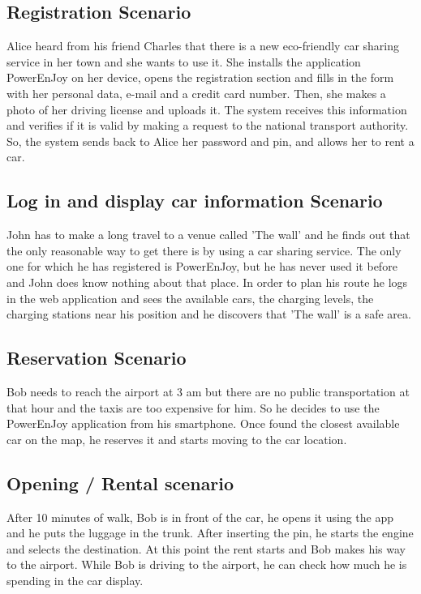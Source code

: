 \subsection {Registration Scenario}
Alice heard from his friend Charles that there is a new eco-friendly car sharing service in her town and she wants to use it. She installs the application PowerEnJoy on her device, opens the registration section and fills in the form with her personal data, e-mail and a credit card number. Then, she makes a photo of her driving license and uploads it. The system receives this information and verifies if it is valid by making a request to the national transport authority. So, the system sends back to Alice her password and pin, and allows her to rent a car.

\subsection{Log in and display car information Scenario}
John has to make a long travel to a venue called 'The wall' and he finds out that the only reasonable way to get there is by using a car sharing service. The only one for which he has registered is PowerEnJoy, but he has never used it before and John does know nothing about that place. In order to plan his route he logs in the web application and sees the available cars, the charging levels, the charging stations near his position and he discovers that 'The wall' is a safe area. 

\subsection{Reservation Scenario}
Bob needs to reach the airport at 3 am but there are no public transportation at that hour and the taxis are too expensive for him. So he decides to use the PowerEnJoy application from his smartphone. Once found the closest available car on the map, he reserves it and starts moving to the car location.

\subsection{Opening / Rental scenario}
After 10 minutes of walk, Bob is in front of the car, he opens it using the app and he puts the luggage in the trunk. After inserting the pin, he starts the engine and selects the destination. At this point the rent starts and Bob makes his way to the airport. While Bob is driving to the airport, he can check how much he is spending in the car display.

